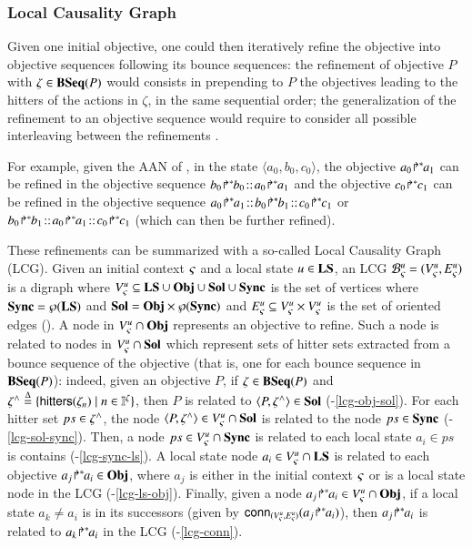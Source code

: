 \subsubsection{Local Causality Graph}

Given one initial objective, one could then iteratively refine the objective into objective
sequences following its bounce sequences:
the refinement of objective $P$ with $\zeta\in\mathbf{BSeq}(P)$ would consists in prepending to $P$ the
objectives leading to the hitters of the actions in $\zeta$, in the same sequential order;
the generalization of the refinement to an objective sequence would require to consider all possible
interleaving between the refinements \cite{PMR12-MSCS}.

For example, given the AAN of ,
in the state $\langle a_0,b_0,c_0\rangle$,
the objective ${a_0\!\Rsh^*\!\!a_1}$ can be refined in the objective sequence
$\obj{b_0}{b_0}\concat\obj{a_0}{a_1}$
and
the objective ${c_0\!\Rsh^*\!\!c_1}$ can be refined in the objective sequence
$\obj{a_0}{a_1}\concat\obj{b_0}{b_1}\concat\obj{c_0}{c_1}$
or
$\obj{b_0}{b_1}\concat\obj{a_0}{a_1}\concat\obj{c_0}{c_1}$
(which can then be further refined).

These refinements can be summarized with a so-called Local Causality Graph (LCG).
Given an initial context $\varsigma$ and a local state $u\in\mathbf{LS}$,
an LCG ${\mathcal{B}_{\varsigma}^{u}} = (V_\varsigma^u, E_\varsigma^u)$
is a digraph where $V_\varsigma^u \subseteq \mathbf{LS}\cup \mathbf{Obj} \cup \mathbf{Sol} \cup \mathbf{Sync}$ is the set of vertices
where $\mathbf{Sync}=\wp(\mathbf{LS})$ and $\mathbf{Sol}=\mathbf{Obj}\times\wp(\mathbf{Sync})$
and $E_\varsigma^u \subseteq V_\varsigma^u \times V_\varsigma^u$ is the set of oriented edges
().
A node in $V_\varsigma^u\cap\mathbf{Obj}$ represents an objective to refine.
Such a node is related to nodes in $V_\varsigma^u\cap\mathbf{Sol}$ which represent
sets of hitter sets extracted from a
bounce sequence of the objective
(that is, one for each bounce sequence in $\mathbf{BSeq}(P)$): indeed,
given an objective $P$, if $\zeta\in\mathbf{BSeq}(P)$
and $\zeta^\wedge \stackrel{\Delta}= \{\mathsf{hitters}(\zeta_n) \mid
n\in\mathbb{I}^{\zeta} \}$, then $P$ is related to $\langle P, \zeta^\wedge\rangle\in\mathbf{Sol}$
(-\ref{lcg-obj-sol}).
For each hitter set $ps\in\zeta^\wedge$,
the node $\langle P,\zeta^\wedge\rangle\in V_\varsigma^u\cap\mathbf{Sol}$ is
related to the node $ps\in\mathbf{Sync}$
(-\ref{lcg-sol-sync}).
Then, a node $ps\in V_\varsigma^u\cap\mathbf{Sync}$ is related to each local state $a_i \in ps$ is contains
(-\ref{lcg-sync-ls}).
A local state node $a_i\in V_\varsigma^u\cap\mathbf{LS}$
is related to each objective ${a_j\!\Rsh^*\!\!a_i} \in \mathbf{Obj}$, where
$a_j$ is either in the initial context $\varsigma$ or
is a local state node in the LCG
(-\ref{lcg-ls-obj}).
Finally, given a node ${a_j\!\Rsh^*\!\!a_i}\in V_\varsigma^u\cap\mathbf{Obj}$,
if a local state $a_k\neq a_i$ is in its successors (given by
$\mathsf{conn}_{({V_\varsigma^u},{E_\varsigma^u})}({a_j\!\Rsh^*\!\!a_i})$), then
${a_j\!\Rsh^*\!\!a_i}$ is related to ${a_k\!\Rsh^*\!\!a_i}$ in the LCG
(-\ref{lcg-conn}).

